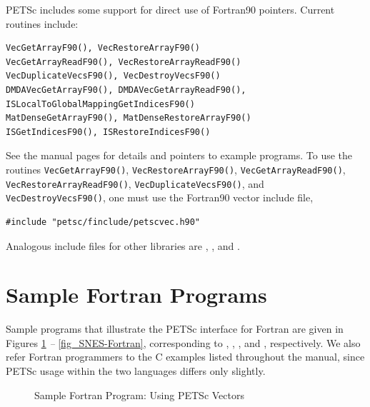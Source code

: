PETSc includes some support for direct use of Fortran90 pointers.
Current routines include:
\begin{lstlisting}
VecGetArrayF90(), VecRestoreArrayF90()
VecGetArrayReadF90(), VecRestoreArrayReadF90()
VecDuplicateVecsF90(), VecDestroyVecsF90()
DMDAVecGetArrayF90(), DMDAVecGetArrayReadF90(), ISLocalToGlobalMappingGetIndicesF90()
MatDenseGetArrayF90(), MatDenseRestoreArrayF90()
ISGetIndicesF90(), ISRestoreIndicesF90()
\end{lstlisting}
See the manual pages for details and pointers to example programs.  To
use the
routines \lstinline{VecGetArrayF90()}, \lstinline{VecRestoreArrayF90()}, \lstinline{VecGetArrayReadF90()}, \lstinline{VecRestoreArrayReadF90()},
\lstinline{VecDuplicateVecsF90()}, and \lstinline{VecDestroyVecsF90()}, one must
use the Fortran90 vector include file,
\begin{lstlisting}
#include "petsc/finclude/petscvec.h90"
\end{lstlisting}
Analogous include files for other libraries are ,
, and .

\section{Sample Fortran Programs}
\label{sec_fortran-examples}

Sample programs that illustrate the PETSc interface for Fortran
are given in Figures \ref{fig_vec-Fortran} {\em --} \ref{fig_SNES-Fortran},
corresponding to
\href{http://www.mcs.anl.gov/petsc/petsc-current/src/vec/vec/examples/tests/ex19f.F.html}{},
\href{http://www.mcs.anl.gov/petsc/petsc-current/src/vec/vec/examples/tutorials/ex4f.F.html}{},
\break 
\href{http://www.mcs.anl.gov/petsc/petsc-current/src/sys/classes/draw/examples/tests/ex5f.F.html}{}, and
\href{http://www.mcs.anl.gov/petsc/petsc-current/src/snes/examples/tutorials/ex1f.F.html}{}, respectively.  We also
refer Fortran programmers to the C examples listed throughout the manual,
since PETSc usage within the two languages differs only slightly.

\begin{figure}[H]
  
\caption{Sample Fortran Program:  Using PETSc Vectors}
\label{fig_vec-Fortran}
\end{figure}

